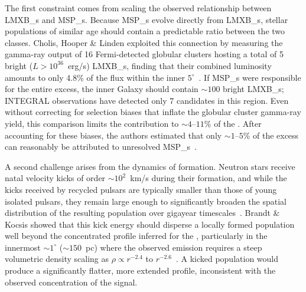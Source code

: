 The first constraint comes from scaling the observed relationship between \glspl{LMXB_} and \glspl{MSP_}.
Because \glspl{MSP_} evolve directly from \glspl{LMXB_}, stellar populations of similar age should contain a predictable ratio between the two classes.
Cholis, Hooper \& Linden exploited this connection by measuring the gamma-ray output of 16 Fermi-detected globular clusters hosting a total of 5 bright ($L > 10^{36}$~erg/s) \glspl{LMXB_}, finding that their combined luminosity amounts to only 4.8\% of the \GCE flux within the inner $5^\circ$~\cite{Cholis:2014lta}.
If \glspl{MSP_} were responsible for the entire excess, the inner Galaxy should contain $\sim 100$ bright \glspl{LMXB_}; INTEGRAL observations have detected only 7 candidates in this region.
Even without correcting for selection biases that inflate the globular cluster gamma-ray yield, this comparison limits the \MSP contribution to $\sim 4$--$11$\% of the \GCE.
After accounting for these biases, the authors estimated that only $\sim 1$--$5$\% of the excess can reasonably be attributed to unresolved \glspl{MSP_}~\cite{Cholis:2014lta}.

A second challenge arises from the dynamics of \MSP formation.
Neutron stars receive natal velocity kicks of order $\sim 10^2$~km/s during their formation, and while the kicks received by recycled pulsars are typically smaller than those of young isolated pulsars, they remain large enough to significantly broaden the spatial distribution of the resulting \MSP population over gigayear timescales~\cite{Brandt:2015ula}.
Brandt \& Kocsis showed that this kick energy should disperse a locally formed \MSP population well beyond the concentrated profile inferred for the \GCE, particularly in the innermost $\sim 1^\circ$ ($\sim 150$~pc) where the observed emission requires a steep volumetric density scaling as $\rho \propto r^{-2.4}$ to $r^{-2.6}$~\cite{Brandt:2015ula}.
A kicked population would produce a significantly flatter, more extended profile, inconsistent with the observed concentration of the signal.

